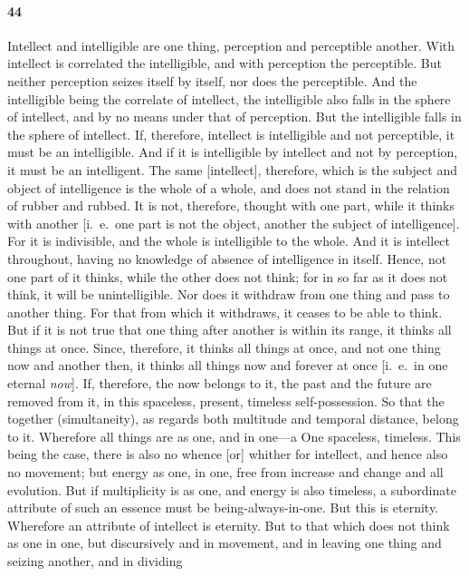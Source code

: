 \documentclass[12pt]{article}
\begin{document}
\paragraph{44} Intellect and intelligible are one thing, perception and
perceptible another. With intellect is correlated the intelligible, and with
perception the perceptible. But neither perception seizes itself by itself, nor
does the perceptible. And the intelligible being the correlate of intellect,
the intelligible also falls in the sphere of intellect, and by no means under
that of perception. But the intelligible falls in the sphere of intellect. If,
therefore, intellect is intelligible and not perceptible, it must be an
intelligible. And if it is intelligible by intellect and not by perception, it
must be an intelligent. The same [intellect], therefore, which is the subject
and object of intelligence is the whole of a whole, and does not stand in the
relation of rubber and rubbed. It is not, therefore, thought with one part,
while it thinks with another [i.~e.~one part is not the object, another the
subject of intelligence]. For it is indivisible, and the whole is intelligible
to the whole. And it is intellect throughout, having no knowledge of absence of
intelligence in itself. Hence, not one part of it thinks, while the other does
not think; for in so far as it does not think, it will be unintelligible. Nor
does it withdraw from one thing and pass to another thing. For that from which
it withdraws, it ceases to be able to think. But if it is not true that one
thing after another is within its range, it thinks all things at once. Since,
therefore, it thinks all things at once, and not one thing now and another
then, it thinks all things now and forever at once [i.~e.~in one eternal
\textit{now}]. If, therefore, the now belongs to it, the past and the future
are removed from it, in this spaceless, present, timeless self-possession. So
that the together (simultaneity), as regards both multitude and temporal
distance, belong to it. Wherefore all things are as one, and in one---a One
spaceless, timeless. This being the case, there is also no whence [or] whither
for intellect, and hence also no movement; but energy as one, in one, free from
increase and change and all evolution. But if multiplicity is as one, and
energy is also timeless, a subordinate attribute of such an essence must be
being-always-in-one. But this is eternity. Wherefore an attribute of intellect
is eternity. But to that which does not think as one in one, but discursively
and in movement, and in leaving one thing and seizing another, and in dividing
\end{document}
